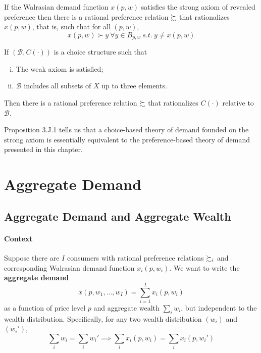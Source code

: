 \documentclass{article}
\begin{document}
 			\begin{proposition}[3.J.1]
 				If the Walrasian demand function $x(p, w)$ satisfies the strong axiom of revealed preference then there is a rational preference relation $\succsim$ that rationalizes $x(p, w)$, that is, such that for all $(p, w)$, 
 				\begin{equation}
 					x(p, w) \succ y\ \forall y \in B_{p, w}\ s.t.\ y \neq x(p, w)
 				\end{equation}
 			\end{proposition}
 			
			\begin{proposition}
				If $(\mathscr{B}, C(\cdot))$ is a choice structure such that
				\begin{enumerate}[(i)]
					\item The weak axiom is satisfied;
					\item $\mathscr{B}$ includes all subsets of $X$ up to three elements.
				\end{enumerate}
				Then there is a rational preference relation $\succsim$ that rationalizes $C(\cdot)$ relative to $\mathscr{B}$.
			\end{proposition}
 			
 			\begin{remark}
 				Proposition 3.J.1 tells us that a choice-based theory of demand founded on the strong axiom is essentially equivalent to the preference-based theory of demand presented in this chapter.
 			\end{remark}
 	
 	\section{Aggregate Demand}
 		\subsection{Aggregate Demand and Aggregate Wealth}
	 		\paragraph{Context}Suppose there are $I$ consumers with rational preference relations $\succsim_i$ and corresponding Walrasian demand function $x_i(p, w_i)$. We want to write the \textbf{aggregate demand}
	 		\begin{equation}
	 			x\left(p, w_{1}, \ldots, w_{I}\right)=\sum_{i=1}^{I} x_{i}\left(p, w_{i}\right)
	 		\end{equation}
	 		as a function of price level $p$ and aggregate wealth $\sum_i w_i$, but independent to the wealth distribution. Specifically, for any two wealth distribution $(w_i)$ and $(w_i')$,
	 		\begin{equation}
	 			\sum_i w_i = \sum_i w_i' \implies \sum_i x_i(p, w_i) = \sum_i x_i(p, w_i')
	 		\end{equation}
	 		
\end{document}
